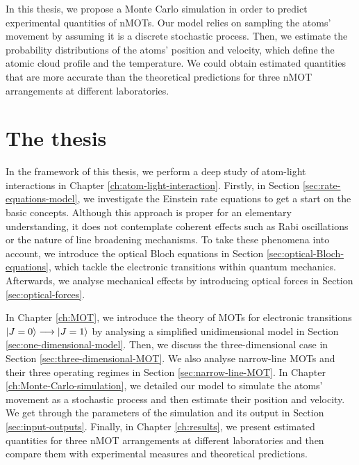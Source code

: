 In this thesis, we propose a Monte Carlo simulation in order to predict experimental quantities of nMOTs. Our model relies on sampling the atoms' movement by assuming it is a discrete stochastic process. Then, we estimate the probability distributions of the atoms' position and velocity, which define the atomic cloud profile and the temperature. We could obtain estimated quantities that are more accurate than the theoretical predictions for three nMOT arrangements at different laboratories.

\section{The thesis}
\label{sec:introduction-thesis}

In the framework of this thesis, we perform a deep study of atom-light interactions in Chapter \ref{ch:atom-light-interaction}. Firstly, in Section \ref{sec:rate-equations-model}, we investigate the Einstein rate equations to get a start on the basic concepts. Although this approach is proper for an elementary understanding, it does not contemplate coherent effects such as Rabi oscillations or the nature of line broadening mechanisms. To take these phenomena into account, we introduce the optical Bloch equations in Section \ref{sec:optical-Bloch-equations}, which tackle the electronic transitions within quantum mechanics. Afterwards, we analyse mechanical effects by introducing optical forces in Section \ref{sec:optical-forces}.

In Chapter \ref{ch:MOT}, we introduce the theory of MOTs for electronic transitions $ \ket{J = 0} \longrightarrow \ket{J = 1} $ by analysing a simplified unidimensional model in Section \ref{sec:one-dimensional-model}. Then, we discuss the three-dimensional case in Section \ref{sec:three-dimensional-MOT}. We also analyse narrow-line MOTs and their three operating regimes in Section \ref{sec:narrow-line-MOT}. In Chapter \ref{ch:Monte-Carlo-simulation}, we detailed our model to simulate the atoms' movement as a stochastic process and then estimate their position and velocity. We get through the parameters of the simulation and its output in Section \ref{sec:input-outputs}. Finally, in Chapter \ref{ch:results}, we present estimated quantities for three nMOT arrangements at different laboratories and then compare them with experimental measures and theoretical predictions.

